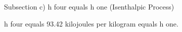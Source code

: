 Subsection c) h four equals h one (Isenthalpic Process)

h four equals 93.42 kilojoules per kilogram equals h one.
